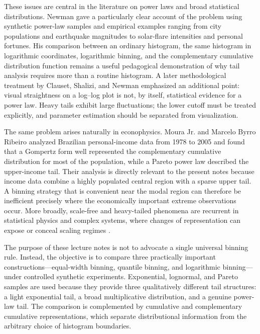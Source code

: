 \documentclass[12pt]{article}
\numberwithin{equation}{section}
\begin{document}
These issues are central in the literature on power laws and broad statistical distributions. Newman \cite{Newman2005} gave a particularly clear account of the problem using synthetic power-law samples and empirical examples ranging from city populations and earthquake magnitudes to solar-flare intensities and personal fortunes. His comparison between an ordinary histogram, the same histogram in logarithmic coordinates, logarithmic binning, and the complementary cumulative distribution function remains a useful pedagogical demonstration of why tail analysis requires more than a routine histogram. A later methodological treatment by Clauset, Shalizi, and Newman \cite{ClausetShaliziNewman2009} emphasized an additional point: visual straightness on a log--log plot is not, by itself, statistical evidence for a power law. Heavy tails exhibit large fluctuations; the lower cutoff must be treated explicitly, and parameter estimation should be separated from visualization.

The same problem arises naturally in econophysics. Moura Jr. and Marcelo Byrro Ribeiro \cite{MouraRibeiro2009} analyzed Brazilian personal-income data from 1978 to 2005 and found that a Gompertz form well represented the complementary cumulative distribution for most of the population, while a Pareto power law described the upper-income tail. Their analysis is directly relevant to the present notes because income data combine a highly populated central region with a sparse upper tail. A binning strategy that is convenient near the modal region can therefore be inefficient precisely where the economically important extreme observations occur. More broadly, scale-free and heavy-tailed phenomena are recurrent in statistical physics and complex systems, where changes of representation can expose or conceal scaling regimes \cite{Sornette2006}.

The purpose of these lecture notes is not to advocate a single universal binning rule. Instead, the objective is to compare three practically important constructions---equal-width binning, quantile binning, and logarithmic binning---under controlled synthetic experiments. Exponential, lognormal, and Pareto samples are used because they provide three qualitatively different tail structures: a light exponential tail, a broad multiplicative distribution, and a genuine power-law tail. The comparison is complemented by cumulative and complementary cumulative representations, which separate distributional information from the arbitrary choice of histogram boundaries.
\end{document}
